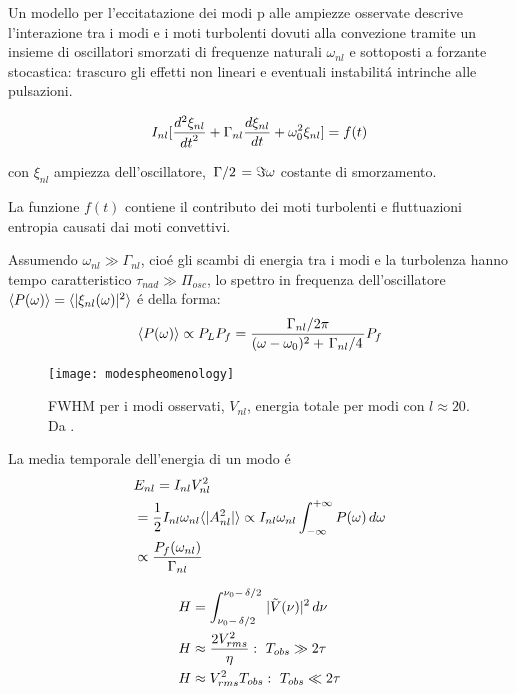 \documentclass[../main.tex]{subfiles}
\begin{document}
Un modello per l'eccitatazione dei modi p alle ampiezze osservate descrive l'interazione tra i modi e i moti turbolenti dovuti alla convezione tramite un insieme di oscillatori smorzati di frequenze naturali $\omega_{nl}$ e sottoposti a forzante stocastica: trascuro gli effetti non lineari e eventuali instabilit\'a intrinche alle pulsazioni.

\begin{equation}
I_{nl}[\TtwoDy{t}{\xi_{nl}}+\Gamma_{nl}\TDy{t}{\xi_{nl}}+\omega_0^2\xi_{nl}]=f(t)
\end{equation}

con $\xi_{nl}$ ampiezza dell'oscillatore, $\midfrac{\Gamma}{2}=\Im{\omega}$ costante di smorzamento.

La funzione $f(t)$ contiene il contributo dei moti turbolenti e fluttuazioni entropia causati dai moti convettivi.

Assumendo $\omega_{nl}\gg\Gamma_{nl}$, cio\'e gli scambi di energia tra i modi e la turbolenza hanno tempo caratteristico $\tau_{nad}\gg\Pi_{osc}$, lo spettro in frequenza dell'oscillatore $\exv{P(\omega)}=\exv{|\xi_{nl}(\omega)|^2}$ \'e della forma:
\begin{equation}
\exv{P(\omega)}\propto P_LP_f=\frac{\midfrac{\Gamma_{nl}}{2\pi}}{(\omega-\omega_0)^2+\midfrac{\Gamma_{nl}}{4}}P_f
\end{equation}

\begin{wrapfigure}[20]{r}{0.5\textwidth}
\centering
\texttt{[image: modespheomenology]}
\caption{FWHM per i modi osservati, $V_{nl}$, energia totale per modi con $l\approx20$. Da \cite{libbrecht1988solar}.}\label{fig:modespheomenology}
\end{wrapfigure}

La media temporale dell'energia di un modo \'e
\begin{align}
&E_{nl}=I_{nl}V_{nl}^2\\
&=\frac{1}{2}I_{nl}\omega_{nl}\exv{|A_{nl}^2|}\propto I_{nl}\omega_{nl}\intsinf{}P(\omega)\,d\omega\\
&\propto\frac{P_f(\omega_{nl})}{\Gamma_{nl}}
\end{align}

\begin{align}
&H=\int_{\nu_0-\midfrac{\delta}{2}}^{\nu_0-\midfrac{\delta}{2}}|\tilde{V}(\nu)|^2\,d\nu\\
&H\approx\frac{2V_{rms}^2}{\eta}:\ T_{obs}\gg 2\tau\\
&H\approx V_{rms}^2T_{obs}:\ T_{obs}\ll 2\tau
\end{align}
\end{document}
